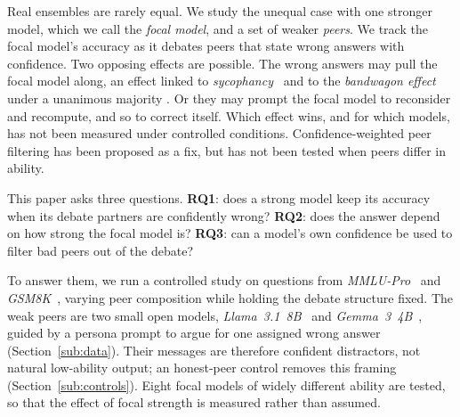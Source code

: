\documentclass[11pt]{article}
\begin{document}
Real ensembles are rarely equal.
We study the unequal case with one stronger model, which we call the
\textit{focal model}, and a set of weaker \textit{peers}.
We track the focal model's accuracy as it debates peers that state wrong
answers with confidence.
Two opposing effects are possible.
The wrong answers may pull the focal model along, an effect linked to
\textit{sycophancy}~\citep{sharma2023towards} and to the
\textit{bandwagon effect} under a unanimous majority
\citep{asch1951effects,koo2024benchmarking}.
Or they may prompt the focal model to reconsider and recompute, and so to
correct itself.
Which effect wins, and for which models, has not been measured under
controlled conditions.
Confidence-weighted peer filtering has been proposed as a fix, but has not
been tested when peers differ in ability.

This paper asks three questions.
\textbf{RQ1}: does a strong model keep its accuracy when its debate
partners are confidently wrong?
\textbf{RQ2}: does the answer depend on how strong the focal model is?
\textbf{RQ3}: can a model's own confidence be used to filter bad peers out
of the debate?

To answer them, we run a controlled study on questions from
\textit{MMLU-Pro}~\citep{wang2024mmlupro} and
\textit{GSM8K}~\citep{cobbe2021training}, varying peer composition while
holding the debate structure fixed.
The weak peers are two small open models,
\textit{Llama~3.1~8B}~\citep{meta2024llama3} and
\textit{Gemma~3~4B}~\citep{gemma2025technical}, guided by a persona prompt
to argue for one assigned wrong answer (Section~\ref{sub:data}).
Their messages are therefore confident distractors, not natural
low-ability output; an honest-peer control removes this framing
(Section~\ref{sub:controls}).
Eight focal models of widely different ability are tested, so that the
effect of focal strength is measured rather than assumed.
\end{document}

